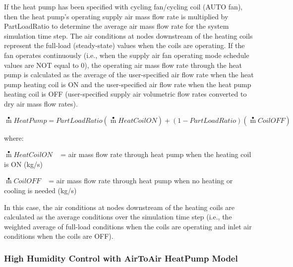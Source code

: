 If the heat pump has been specified with cycling fan/cycling coil (AUTO fan), then the heat pump's operating supply air mass flow rate is multiplied by PartLoadRatio to determine the average air mass flow rate for the system simulation time step. The air conditions at nodes downstream of the heating coils represent the full-load (steady-state) values when the coils are operating. If the fan operates continuously (i.e., when the supply air fan operating mode schedule values are NOT equal to 0), the operating air mass flow rate through the heat pump is calculated as the average of the user-specified air flow rate when the heat pump heating coil is ON and the user-specified air flow rate when the heat pump heating coil is OFF (user-specified supply air volumetric flow rates converted to dry air mass flow rates).

\begin{equation}
\mathop m\limits^ \bullet  HeatPump = PartLoadRatio\left( {\mathop m\limits^ \bullet  HeatCoilON} \right) + \left( {1 - PartLoadRatio} \right)\left( {\mathop m\limits^ \bullet  CoilOFF} \right)
\end{equation}

where:

\(\mathop m\limits^ \bullet HeatCoilON\) ~ = air mass flow rate through heat pump when the heating coil is ON (kg/s)

\(\mathop m\limits^ \bullet CoilOFF\) ~ = air mass flow rate through heat pump when no heating or cooling is needed (kg/s)

In this case, the air conditions at nodes downstream of the heating coils are calculated as the average conditions over the simulation time step (i.e., the weighted average of full-load conditions when the coils are operating and inlet air conditions when the coils are OFF).

\subsubsection{High Humidity Control with AirToAir HeatPump Model}\label{high-humidity-control-with-airtoair-heatpump-model}

